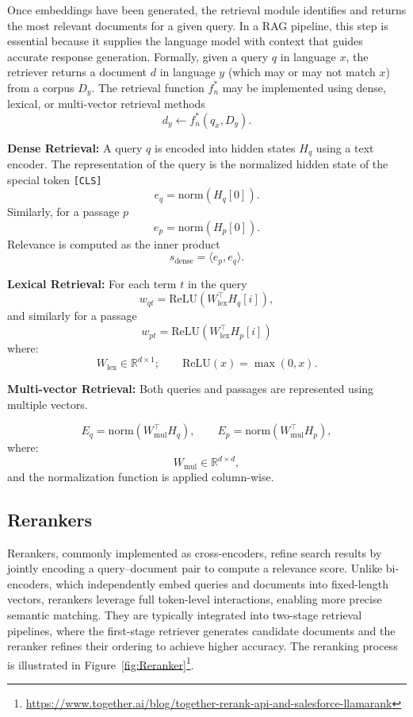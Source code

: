 Once embeddings have been generated, the retrieval module identifies and returns the most relevant
documents for a given query. In a RAG pipeline, this step is essential because it supplies the language
model with context that guides accurate response generation. Formally, given a query $q$ in language $x$,
the retriever returns a document $d$ in language $y$ (which may or may not match $x$) from a corpus
$D_y$. The retrieval function $f_n^\ast$ may be implemented using dense, lexical, or multi-vector retrieval
methods~\cite{chen2024bge}
\[
    d_y \leftarrow f_n^\ast(q_x, D_y).
\]

\textbf{Dense Retrieval:} A query $q$ is encoded into hidden states $H_q$ using a text encoder. The representation of the query
is the normalized hidden state of the special token \texttt{[CLS]}
\[
    e_q = \mathrm{norm}(H_q[0]).
\]
Similarly, for a passage $p$
\[
    e_p = \mathrm{norm}(H_p[0]).
\]
Relevance is computed as the inner product
\[
    s_{\mathrm{dense}} = \langle e_p, e_q \rangle.
\]

\textbf{Lexical Retrieval:} For each term $t$ in the query
\[
    w_{q t} = \mathrm{ReLU}(W_{\mathrm{lex}}^\top H_q[i]),
\]
and similarly for a passage
\[
    w_{p t} = \mathrm{ReLU}(W_{\mathrm{lex}}^\top H_p[i])
\]
where:
\[
    W_{\mathrm{lex}} \in \mathbb{R}^{d \times 1};
\qquad
\mathrm{ReLU}(x) = \max(0, x).
\]

\textbf{Multi-vector Retrieval:} Both queries and passages are represented using multiple vectors.

\[
    E_q = \mathrm{norm}(W_{\mathrm{mul}}^\top H_q),
    \qquad
    E_p = \mathrm{norm}(W_{\mathrm{mul}}^\top H_p),
\]
where:
\[
    W_{\mathrm{mul}} \in \mathbb{R}^{d \times d},
\]
and the normalization function is applied column-wise.


\subsection{Rerankers}

Rerankers, commonly implemented as cross-encoders, refine search results by jointly encoding a query--document pair to compute a relevance score. Unlike bi-encoders, which independently embed queries and documents into fixed-length vectors, rerankers leverage full token-level interactions, enabling more precise semantic matching. They are typically integrated into two-stage retrieval pipelines, where the first-stage retriever generates candidate documents and the reranker refines their ordering to achieve higher accuracy. The reranking process is illustrated in Figure~\ref{fig:Reranker}\footnote{\url{https://www.together.ai/blog/together-rerank-api-and-salesforce-llamarank}}.

